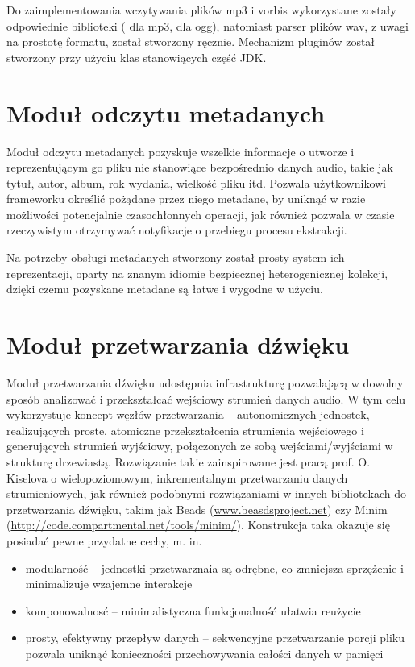 Do zaimplementowania wczytywania plików mp3 i vorbis wykorzystane zostały odpowiednie biblioteki
( dla mp3,  dla ogg), natomiast parser plików wav, z uwagi na prostotę
formatu, został stworzony ręcznie. Mechanizm pluginów został stworzony przy użyciu klas stanowiących
część JDK.


\section{Moduł odczytu metadanych}

Moduł odczytu metadanych pozyskuje wszelkie informacje o utworze i reprezentującym go pliku nie
stanowiące bezpośrednio danych audio, takie jak tytuł, autor, album, rok wydania, wielkość pliku
itd. Pozwala użytkownikowi frameworku określić pożądane przez niego metadane, by uniknąć w razie
możliwości potencjalnie czasochłonnych operacji, jak również pozwala w czasie rzeczywistym
otrzymywać notyfikacje o przebiegu procesu ekstrakcji. 

Na potrzeby obsługi metadanych stworzony został prosty system ich reprezentacji, oparty na znanym
idiomie bezpiecznej heterogenicznej kolekcji, dzięki czemu pozyskane metadane są łatwe i wygodne w
użyciu.


\section{Moduł przetwarzania dźwięku}

Moduł przetwarzania dźwięku udostępnia infrastrukturę pozwalającą w dowolny sposób analizować i
przekształcać wejściowy strumień danych audio. W tym celu wykorzystuje koncept węzłów przetwarzania
-- autonomicznych jednostek, realizujących proste, atomiczne przekształcenia strumienia wejściowego
i generujących strumień wyjściowy, połączonych ze sobą wejściami/wyjściami w strukturę drzewiastą.
Rozwiązanie takie zainspirowane jest pracą prof. O. Kiselova o wielopoziomowym, inkrementalnym
przetwarzaniu danych strumieniowych, jak również podobnymi rozwiązaniami w innych bibliotekach do
przetwarzania dźwięku, takim jak Beads (\url{www.beasdsproject.net}) czy Minim
(\url{http://code.compartmental.net/tools/minim/}). Konstrukcja taka okazuje się posiadać pewne
przydatne cechy, m. in. 

\begin{itemize}

  \item modularność -- jednostki przetwarznaia są odrębne, co zmniejsza sprzężenie i minimalizuje
    wzajemne interakcje

  \item komponowalnosć -- minimalistyczna funkcjonalność ułatwia reużycie

  \item prosty, efektywny przepływ danych -- sekwencyjne przetwarzanie porcji pliku pozwala uniknąć
    konieczności przechowywania całości danych w pamięci

\end{itemize}

